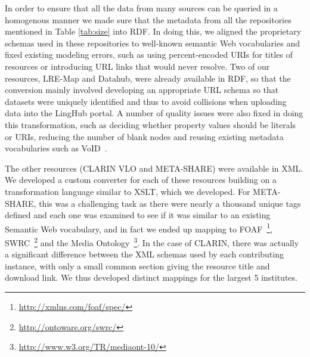 \documentclass{acm_proc_article-sp}
\begin{document}
In order to ensure that all the data from many sources can be queried in a
homogenous manner we made sure that the metadata from all the repositories mentioned in Table \ref{tab:size} into RDF.
In doing this, we aligned the proprietary schemas used in these repositories to
well-known semantic Web vocabularies and fixed existing modeling errors, such as
using percent-encoded URIs for titles of resources or introducing URL links that
would never resolve.
Two of our resources, LRE-Map and Datahub, were already available in RDF, so that the conversion
mainly involved developing an appropriate URL schema so that datasets were
uniquely identified and thus to avoid collisions when uploading data into the
LingHub portal. A number of quality issues were also fixed in doing this
transformation, such as deciding whether property values should be literals or
URIs, reducing the number of blank nodes and reusing existing metadata
vocabularies such as VoID~\cite{alexander2011describing}.

The other resources (CLARIN VLO and META-SHARE) were available in XML. We
developed a custom
converter for each of these resources building on a 
transformation language similar to XSLT, which we developed. For META-SHARE, this was a challenging
task as there were nearly a thousand unique tags defined and each one was
examined to see if it was similar to an existing Semantic Web vocabulary, and in
fact we ended up mapping to FOAF~\footnote{\url{http://xmlns.com/foaf/spec/}},
SWRC~\footnote{\url{http://ontoware.org/swrc/}} and the Media
Ontology~\footnote{\url{http://www.w3.org/TR/mediaont-10/}}. In the case of
CLARIN, there was actually a significant difference between the XML schemas used
by each contributing instance, with only a small common section giving the
resource title and download link. We thus developed distinct mappings for the
largest 5 institutes.

\end{document}
